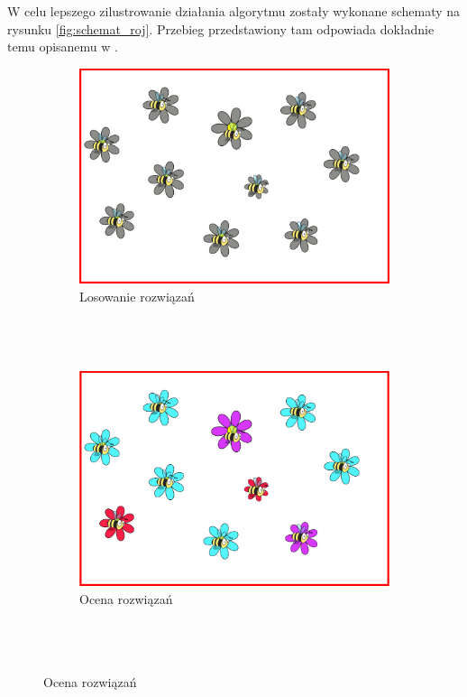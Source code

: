 W celu lepszego zilustrowanie działania algorytmu zostały wykonane schematy na rysunku \ref{fig:schemat_roj}. Przebieg przedstawiony tam odpowiada dokładnie temu opisanemu w \cite{algroj}.

\begin{figure} [htbp]
    \centering
    \begin{subfigure}[b]{0.32\textwidth}
    \includegraphics[width=\linewidth]{figures/rojowe/etap2.png}
    \caption{Losowanie rozwiązań\\~\\~\\~}
    \end{subfigure}
    \begin{subfigure}[b]{0.32\textwidth}
    \includegraphics[width=\linewidth]{figures/rojowe/etap3.png}
    \caption{Ocena rozwiązań\\~\\~\\~}

\end{subfigure}
\end{figure}
